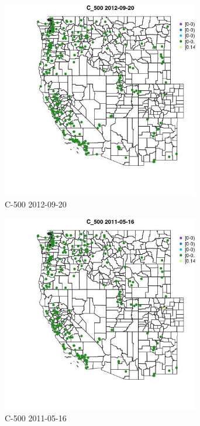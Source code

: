 \begin{figure} 
\centering  
\includegraphics[width=0.77\textwidth]{Code_Outputs/ML_input_report_ML_input_PM25_Step5_part_d_de_duplicated_aves_ML_input_MapObsC_5002012-09-20.jpg} 
\caption{\label{fig:ML_input_report_ML_input_PM25_Step5_part_d_de_duplicated_aves_ML_inputMapObsC_5002012-09-20}C-500 2012-09-20} 
\end{figure} 
 

\begin{figure} 
\centering  
\includegraphics[width=0.77\textwidth]{Code_Outputs/ML_input_report_ML_input_PM25_Step5_part_d_de_duplicated_aves_ML_input_MapObsC_5002011-05-16.jpg} 
\caption{\label{fig:ML_input_report_ML_input_PM25_Step5_part_d_de_duplicated_aves_ML_inputMapObsC_5002011-05-16}C-500 2011-05-16} 
\end{figure} 
 

